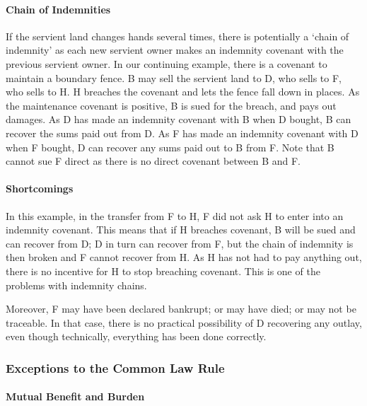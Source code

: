 \documentclass[
]{article}
\begin{document}
\hypertarget{chain-of-indemnities}{%
\paragraph{Chain of Indemnities}\label{chain-of-indemnities}}

If the servient land changes hands several times, there is potentially a
`chain of indemnity' as each new servient owner makes an indemnity
covenant with the previous servient owner. In our continuing example,
there is a covenant to maintain a boundary fence. B may sell the
servient land to D, who sells to F, who sells to H. H breaches the
covenant and lets the fence fall down in places. As the maintenance
covenant is positive, B is sued for the breach, and pays out damages. As
D has made an indemnity covenant with B when D bought, B can recover the
sums paid out from D. As F has made an indemnity covenant with D when F
bought, D can recover any sums paid out to B from F. Note that B cannot
sue F direct as there is no direct covenant between B and F.

\hypertarget{shortcomings}{%
\paragraph{Shortcomings}\label{shortcomings}}

In this example, in the transfer from F to H, F did not ask H to enter
into an indemnity covenant. This means that if H breaches covenant, B
will be sued and can recover from D; D in turn can recover from F, but
the chain of indemnity is then broken and F cannot recover from H. As H
has not had to pay anything out, there is no incentive for H to stop
breaching covenant. This is one of the problems with indemnity chains.

Moreover, F may have been declared bankrupt; or may have died; or may
not be traceable. In that case, there is no practical possibility of D
recovering any outlay, even though technically, everything has been done
correctly.

\hypertarget{exceptions-to-the-common-law-rule}{%
\subsubsection{Exceptions to the Common Law
Rule}\label{exceptions-to-the-common-law-rule}}

\hypertarget{mutual-benefit-and-burden}{%
\paragraph{Mutual Benefit and Burden}\label{mutual-benefit-and-burden}}
\end{document}
